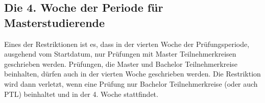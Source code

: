 \newpage
\subsection{Die 4. Woche der Periode für Masterstudierende}
Eines der Restriktionen ist es, dass in der vierten Woche der Prüfungsperiode,
ausgehend vom Startdatum, nur Prüfungen mit Master Teilnehmerkreisen geschrieben werden.
Prüfungen, die Master und Bachelor Teilnehmerkreise beinhalten, dürfen auch in der vierten Woche
geschrieben werden.
Die Restriktion wird dann verletzt, wenn eine Prüfung nur Bachelor Teilnehmerkreise (oder auch PTL) beinhaltet und in der 4. Woche stattfindet.


